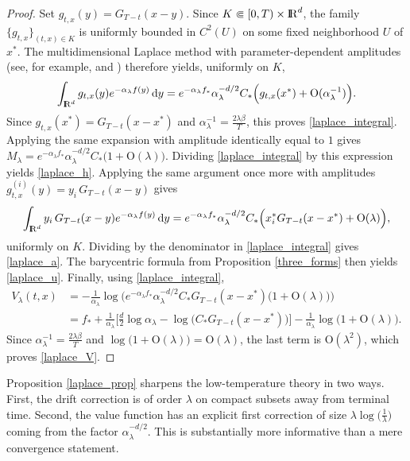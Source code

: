 \documentclass[11pt]{amsart}
\def\R{\mathrm{I\kern-0.21emR}}
\newcommand{\dd}{\,\mathrm{d}}
\numberwithin{equation}{section}
\numberwithin{figure}{section}
\theoremstyle{definition}\newtheorem{remark}[theorem]{Remark}%
\begin{document}
\begin{proof}
Set $g_{t,x}(y) = G_{T-t}(x-y)$.
Since $K \Subset [0,T) \times \R^d$, the family $\{ g_{t,x} \}_{(t,x) \in K}$ is uniformly bounded in $C^2(U)$ on some fixed neighborhood $U$ of $x^*$. The multidimensional Laplace method with parameter-dependent amplitudes (see, for example, \cite[Chapter 4]{deBruijn81} and \cite[Chapter IX]{Wong01}) therefore yields, uniformly on $K$,
$$
\int_{\R^d} g_{t,x}(y)e^{-\alpha_\lambda f(y)}\dd y
=
 e^{-\alpha_\lambda f_*}\alpha_\lambda^{-d/2} C_* \Big( g_{t,x}(x^*) + \mathrm{O}(\alpha_\lambda^{-1}) \Big).
$$
Since $g_{t,x}(x^*) = G_{T-t}(x-x^*)$ and $\alpha_\lambda^{-1} = \frac{2\lambda\beta}{T}$, this proves \eqref{laplace_integral}.
Applying the same expansion with amplitude identically equal to $1$ gives
$M_\lambda = e^{-\alpha_\lambda f_*}\alpha_\lambda^{-d/2} C_* \big( 1 + \mathrm{O}(\lambda) \big)$.
Dividing \eqref{laplace_integral} by this expression yields \eqref{laplace_h}. Applying the same argument once more with amplitudes $g_{t,x}^{(i)}(y) = y_i\, G_{T-t}(x-y)$ gives
$$
\int_{\R^d} y_i\, G_{T-t}(x-y)e^{-\alpha_\lambda f(y)}\dd y
= e^{-\alpha_\lambda f_*}\alpha_\lambda^{-d/2} C_* \Big( x_i^* G_{T-t}(x-x^*) + \mathrm{O}(\lambda) \Big),
$$
uniformly on $K$. Dividing by the denominator in \eqref{laplace_integral} gives \eqref{laplace_a}. The barycentric formula from Proposition \ref{three_forms} then yields \eqref{laplace_u}.
Finally, using \eqref{laplace_integral},
\begin{align*}
V_\lambda(t,x)
&=
- \frac{1}{\alpha_\lambda}\log \bigg( e^{-\alpha_\lambda f_*}\alpha_\lambda^{-d/2} C_* G_{T-t}(x-x^*)\big( 1 + \mathrm{O}(\lambda) \big) \bigg) \\
&=
 f_* + \frac{1}{\alpha_\lambda}\bigg[ \frac{d}{2}\log \alpha_\lambda - \log \Big( C_* G_{T-t}(x-x^*) \Big) \bigg] - \frac{1}{\alpha_\lambda}\log \big( 1 + \mathrm{O}(\lambda) \big).
\end{align*}
Since $\displaystyle \alpha_\lambda^{-1} = \frac{2\lambda\beta}{T}$ and $\log \big( 1 + \mathrm{O}(\lambda) \big) = \mathrm{O}(\lambda)$, the last term is $\mathrm{O}(\lambda^2)$, which proves \eqref{laplace_V}.
\end{proof}

Proposition \ref{laplace_prop} sharpens the low-temperature theory in two ways. First, the drift correction is of order $\lambda$ on compact subsets away from terminal time. Second, the value function has an explicit first correction of size $\lambda \log \big( \frac{1}{\lambda} \big)$ coming from the factor $\alpha_\lambda^{-d/2}$. This is substantially more informative than a mere convergence statement.
\end{document}

